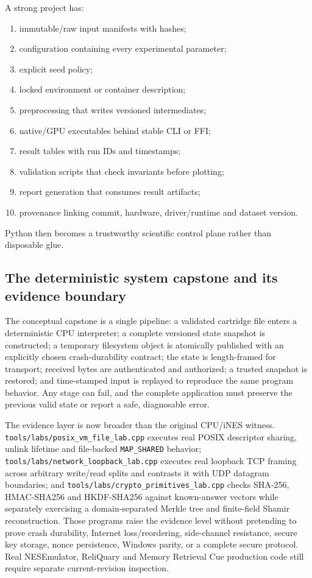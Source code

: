 A strong project has:

\begin{enumerate}
\def\labelenumi{\arabic{enumi}.}
\tightlist
\item
  immutable/raw input manifests with hashes;
\item
  configuration containing every experimental parameter;
\item
  explicit seed policy;
\item
  locked environment or container description;
\item
  preprocessing that writes versioned intermediates;
\item
  native/GPU executables behind stable CLI or FFI;
\item
  result tables with run IDs and timestamps;
\item
  validation scripts that check invariants before plotting;
\item
  report generation that consumes result artifacts;
\item
  provenance linking commit, hardware, driver/runtime and dataset version.
\end{enumerate}

Python then becomes a trustworthy scientific control plane rather than disposable glue.

\subsection{The deterministic system capstone and its evidence boundary}\label{the-deterministic-system-capstone-and-its-evidence-boundary}

The conceptual capstone is a single pipeline: a validated cartridge file enters a deterministic CPU interpreter; a complete versioned state snapshot is constructed; a temporary filesystem object is atomically published with an explicitly chosen crash-durability contract; the state is length-framed for transport; received bytes are authenticated and authorized; a trusted snapshot is restored; and time-stamped input is replayed to reproduce the same program behavior. Any stage can fail, and the complete application must preserve the previous valid state or report a safe, diagnosable error.

The evidence layer is now broader than the original CPU/iNES witness. \texttt{tools/labs/posix\_vm\_file\_lab.cpp} executes real POSIX descriptor sharing, unlink lifetime and file-backed \texttt{MAP\_SHARED} behavior; \texttt{tools/labs/network\_loopback\_lab.cpp} executes real loopback TCP framing across arbitrary write/read splits and contrasts it with UDP datagram boundaries; and \texttt{tools/labs/crypto\_primitives\_lab.cpp} checks SHA-256, HMAC-SHA256 and HKDF-SHA256 against known-answer vectors while separately exercising a domain-separated Merkle tree and finite-field Shamir reconstruction. Those programs raise the evidence level without pretending to prove crash durability, Internet loss/reordering, side-channel resistance, secure key storage, nonce persistence, Windows parity, or a complete secure protocol. Real NESEmulator, ReliQuary and Memory Retrieval Cue production code still require separate current-revision inspection.

